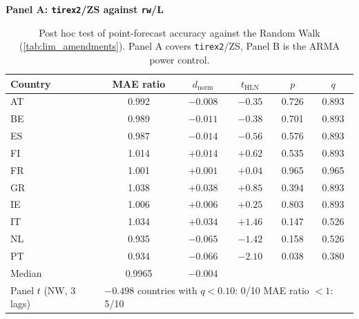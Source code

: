 \begin{table}[t]
\centering
\small
\caption{Post hoc test of point-forecast accuracy against the Random Walk (\cref{tab:lim_amendments}). Panel A covers \texttt{tirex2}/ZS, Panel B is the ARMA power control.}
\label{tab:lim_point}

\textbf{Panel A: \texttt{tirex2}/ZS against \texttt{rw}/L}\\[1mm]
\begin{tabular}{lccccc}
\toprule
Country & MAE ratio & $d_{\mathrm{norm}}$ & $t_{\mathrm{HLN}}$ & $p$ & $q$ \\
\midrule
AT & 0.992 & $-0.008$ & $-0.35$ & 0.726 & 0.893 \\
BE & 0.989 & $-0.011$ & $-0.38$ & 0.701 & 0.893 \\
ES & 0.987 & $-0.014$ & $-0.56$ & 0.576 & 0.893 \\
FI & 1.014 & $+0.014$ & $+0.62$ & 0.535 & 0.893 \\
FR & 1.001 & $+0.001$ & $+0.04$ & 0.965 & 0.965 \\
GR & 1.038 & $+0.038$ & $+0.85$ & 0.394 & 0.893 \\
IE & 1.006 & $+0.006$ & $+0.25$ & 0.803 & 0.893 \\
IT & 1.034 & $+0.034$ & $+1.46$ & 0.147 & 0.526 \\
NL & 0.935 & $-0.065$ & $-1.42$ & 0.158 & 0.526 \\
PT & 0.934 & $-0.066$ & $-2.10$ & 0.038 & 0.380 \\
\midrule
Median & 0.9965 & $-0.004$ & & & \\
Panel $t$ (NW, 3 lags) & \multicolumn{5}{l}{$-0.498$ \quad countries with $q<0.10$: 0/10 \quad MAE ratio $<1$: 5/10} \\
\bottomrule
\end{tabular}


\end{table}
